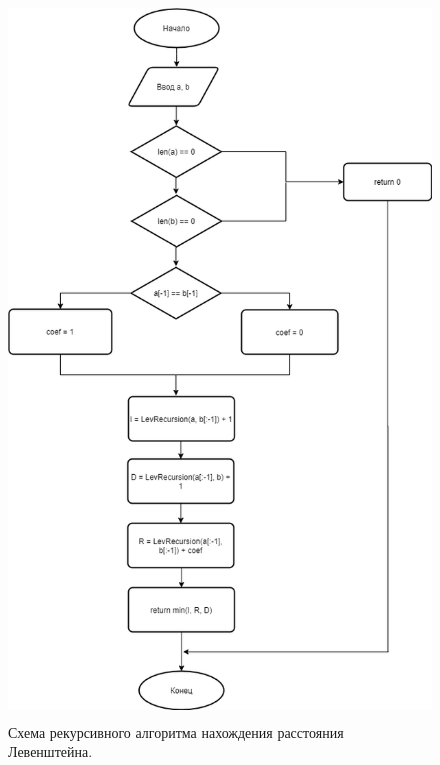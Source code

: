 \documentclass[a4paper,12pt]{article}
\begin{document}
\begin{figure}[H]
	\centering
	\includegraphics[width=12cm, height= 19cm]{levrec.png}
	\captionsetup{justification=centering}
	\caption{Схема рекурсивного алгоритма нахождения расстояния Левенштейна.}
	\label{Рис 2}
\end{figure}
\end{document}
